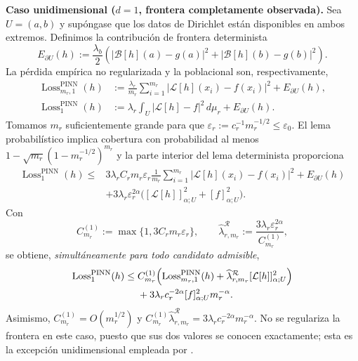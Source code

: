 \medskip
\noindent\textbf{Caso unidimensional ($d=1$, frontera completamente observada).}
Sea $U=(a,b)$ y supóngase que los datos de Dirichlet están disponibles en
ambos extremos. Definimos la contribución de frontera determinista
\[
E_{\partial U}(h):=\frac{\lambda_b}{2}
\left(|\mathcal B[h](a)-g(a)|^2+|\mathcal B[h](b)-g(b)|^2\right).
\]
La pérdida empírica no regularizada y la poblacional son, respectivamente,
\[
\begin{aligned}
\operatorname{Loss}^{\mathrm{PINN}}_{m_r,1}(h)
&:=\frac{\lambda_r}{m_r}\sum_{i=1}^{m_r}
|\mathcal L[h](x_i)-f(x_i)|^2+E_{\partial U}(h),\\
\operatorname{Loss}^{\mathrm{PINN}}_{1}(h)
&:=\lambda_r\int_U|\mathcal L[h]-f|^2\,d\mu_r+E_{\partial U}(h).
\end{aligned}
\]
Tomamos $m_r$ suficientemente grande para que
$\varepsilon_r:=c_r^{-1}m_r^{-1/2}\leq\varepsilon_0$.
El lema probabilístico implica cobertura con probabilidad al menos
$1-\sqrt{m_r}(1-m_r^{-1/2})^{m_r}$ y la parte interior del lema
determinista proporciona
\[
\begin{aligned}
\operatorname{Loss}^{\mathrm{PINN}}_{1}(h)
\leq{}&3\lambda_r C_r m_r\varepsilon_r
\frac1{m_r}\sum_{i=1}^{m_r}|\mathcal L[h](x_i)-f(x_i)|^2
+E_{\partial U}(h)\\
&+3\lambda_r\varepsilon_r^{2\alpha}
\bigl([\mathcal L[h]]_{\alpha;U}^2+[f]_{\alpha;U}^2\bigr).
\end{aligned}
\]
Con
\[
C_{m_r}^{(1)}:=\max\{1,3C_r m_r\varepsilon_r\},\qquad
\widehat\lambda_{r,m_r}^{\mathcal R}
:=\frac{3\lambda_r\varepsilon_r^{2\alpha}}{C_{m_r}^{(1)}},
\]
se obtiene, \emph{simultáneamente para todo candidato admisible},
\begin{equation}\label{eq:thm1_1d}
\begin{split}
\operatorname{Loss}^{\mathrm{PINN}}_{1}(h)
\leq{}&C_{m_r}^{(1)}\Bigl(
\operatorname{Loss}^{\mathrm{PINN}}_{m_r,1}(h)
+\widehat\lambda_{r,m_r}^{\mathcal R}
[\mathcal L[h]]_{\alpha;U}^{2}\Bigr)\\
&+3\lambda_r c_r^{-2\alpha}[f]_{\alpha;U}^2m_r^{-\alpha}.
\end{split}
\end{equation}
Asimismo,
$C_{m_r}^{(1)}=O(m_r^{1/2})$ y
$C_{m_r}^{(1)}\widehat\lambda_{r,m_r}^{\mathcal R}
=3\lambda_r c_r^{-2\alpha}m_r^{-\alpha}$.
No se regulariza la frontera en este caso, puesto que sus dos valores se
conocen exactamente; esta es la excepción unidimensional empleada por
\cite[Theorem~3.1]{shin2020convergence}.

